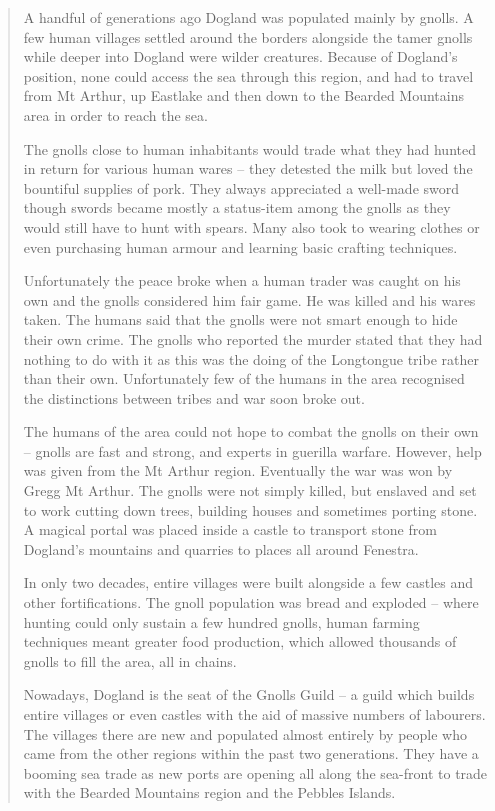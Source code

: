
\begin{quotation}
A handful of generations ago Dogland was populated mainly by gnolls.  A few human villages settled around the borders alongside the tamer gnolls while deeper into Dogland were wilder creatures.  Because of Dogland's position, none could access the sea through this region, and had to travel from Mt Arthur, up Eastlake and then down to the Bearded Mountains area in order to reach the sea.

	The gnolls close to human inhabitants would trade what they had hunted in return for various human wares -- they detested the milk but loved the bountiful supplies of pork.  They always appreciated a well-made sword though swords became mostly a status-item among the gnolls as they would still have to hunt with spears.  Many also took to wearing clothes or even purchasing human armour and learning basic crafting techniques.

	Unfortunately the peace broke when a human trader was caught on his own and the gnolls considered him fair game.  He was killed and his wares taken.  The humans said that the gnolls were not smart enough to hide their own crime.  The gnolls who reported the murder stated that they had nothing to do with it as this was the doing of the Longtongue tribe rather than their own.  Unfortunately few of the humans in the area recognised the distinctions between tribes and war soon broke out.

	The humans of the area could not hope to combat the gnolls on their own -- gnolls are fast and strong, and experts in guerilla warfare.  However, help was given from the Mt Arthur region.  Eventually the war was won by Gregg Mt Arthur.  The gnolls were not simply killed, but enslaved and set to work cutting down trees, building houses and sometimes porting stone.  A magical portal was placed inside a castle to transport stone from Dogland's mountains and quarries to places all around Fenestra.

	In only two decades, entire villages were built alongside a few castles and other fortifications.  The gnoll population was bread and exploded -- where hunting could only sustain a few hundred gnolls, human farming techniques meant greater food production, which allowed thousands of gnolls to fill the area, all in chains.

	Nowadays, Dogland is the seat of the Gnolls Guild -- a guild which builds entire villages or even castles with the aid of massive numbers of labourers.  The villages there are new and populated almost entirely by people who came from the other regions within the past two generations.  They have a booming sea trade as new ports are opening all along the sea-front to trade with the Bearded Mountains region and the Pebbles Islands.
\end{quotation}


